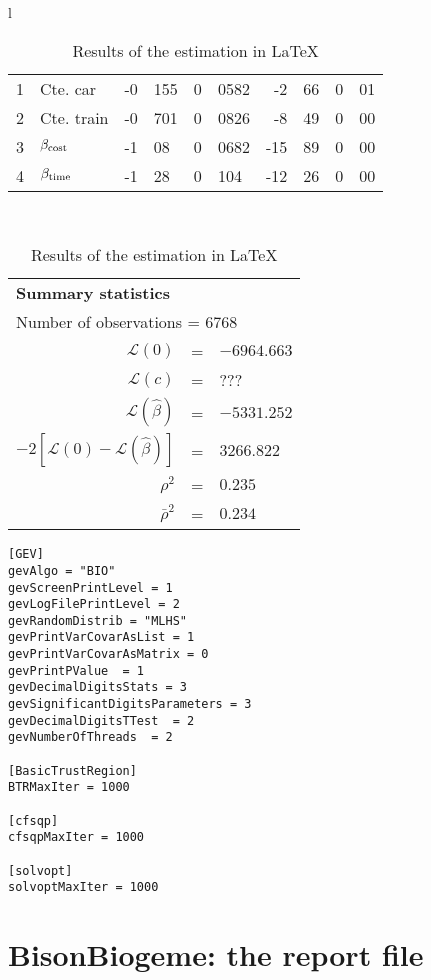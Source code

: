 \documentclass[12pt,a4paper]{article}
\newcommand{\BBIOGEME}{BisonBiogeme}
\begin{document}
\begin{table}[htb]
\begin{tabular}{l}
\begin{tabular}{rlr@{.}lr@{.}lr@{.}lr@{.}l}
1 & Cte. car & -0&155 & 0&0582 & -2&66 & 0&01 \\
2 & Cte. train & -0&701 & 0&0826 & -8&49 & 0&00 \\
3 & $\beta_\protect\text{cost}$ & -1&08 & 0&0682 & -15&89 & 0&00 \\
4 & $\beta_\protect\text{time}$ & -1&28 & 0&104 & -12&26 & 0&00 \\
\hline
\end{tabular}
\\
\begin{tabular}{rcl}
\multicolumn{3}{l}{\bf Summary statistics}\\
\multicolumn{3}{l}{ Number of observations = $6768$} \\
 $\mathcal{L}(0)$ &=&  $-6964.663$ \\
 $\mathcal{L}(c)$ &=& ???\\
 $\mathcal{L}(\hat{\beta})$ &=& $-5331.252 $  \\
 $-2[\mathcal{L}(0) -\mathcal{L}(\hat{\beta})]$ &=& $3266.822$ \\
    $\rho^2$ &=&   $0.235$ \\
    $\bar{\rho}^2$ &=&    $0.234$ \\
\end{tabular}
\end{tabular}
\caption{\label{tab:latex}Results of the estimation in \LaTeX}
\end{table}

\begin{table}[htb]
\begin{lstlisting}[style=nonumbers]
[GEV]
gevAlgo = "BIO"
gevScreenPrintLevel = 1
gevLogFilePrintLevel = 2
gevRandomDistrib = "MLHS"
gevPrintVarCovarAsList = 1
gevPrintVarCovarAsMatrix = 0
gevPrintPValue  = 1
gevDecimalDigitsStats = 3
gevSignificantDigitsParameters = 3
gevDecimalDigitsTTest  = 2
gevNumberOfThreads  = 2

[BasicTrustRegion]
BTRMaxIter = 1000

[cfsqp]
cfsqpMaxIter = 1000

[solvopt]
solvoptMaxIter = 1000
\end{lstlisting}
\caption{\label{tab:par}The \lstinline$.par$ file generated by default}
\end{table}

\clearpage
\section{\BBIOGEME: the report file}
\label{sec:bisonreport}
\end{document}
